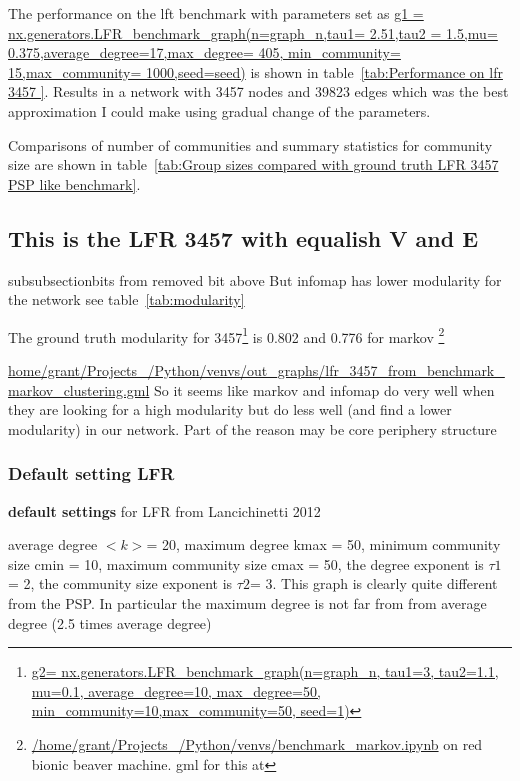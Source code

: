 The performance on the lft benchmark with parameters set as \url{g1 = nx.generators.LFR_benchmark_graph(n=graph_n,tau1= 2.51,tau2 = 1.5,mu= 0.375,average_degree=17,max_degree= 405, min_community= 15,max_community= 1000,seed=seed)} is shown in table~\ref{tab:Performance on lfr 3457 }. Results in a network with 3457 nodes and 39823 edges which was the best approximation I could make using gradual change of the parameters. 

Comparisons of number of communities and summary statistics for community size are shown in table~\ref{tab:Group sizes compared with ground truth LFR 3457 PSP like benchmark}.





\subsection{This is the LFR 3457 with equalish V and E}

subsubsection{bits from removed bit above}
\label{sec:NMI communities}
But infomap has lower modularity for the network see table~\ref{tab:modularity}


The ground truth modularity for 3457\footnote{\url{g2= nx.generators.LFR_benchmark_graph(n=graph_n, tau1=3, tau2=1.1, mu=0.1, average_degree=10, max_degree=50, min_community=10,max_community=50, seed=1)}} is 0.802 and 0.776 for markov 
\footnote{
\url{/home/grant/Projects_/Python/venvs/benchmark_markov.ipynb}
on red bionic beaver machine.  gml for this at 
}

\url{home/grant/Projects_/Python/venvs/out_graphs/lfr_3457_from_benchmark_markov_clustering.gml}
So it seems like markov and infomap do very well when they are looking for a high modularity but do less well (and find a lower modularity) in our network. Part of the reason may be core periphery structure
\subsubsection{Default setting LFR}
\textbf{default settings }for LFR from Lancichinetti 2012 \cite{lancichinetti2012consensus}

average degree $<k>$= 20, maximum degree kmax = 50, minimum community size cmin = 10, maximum community size cmax = 50, the degree exponent is $\tau1$ = 2, the community size exponent is $\tau2$= 3. This graph is clearly quite different from the PSP. In particular the maximum degree is not far from from average degree (2.5 times average degree)

